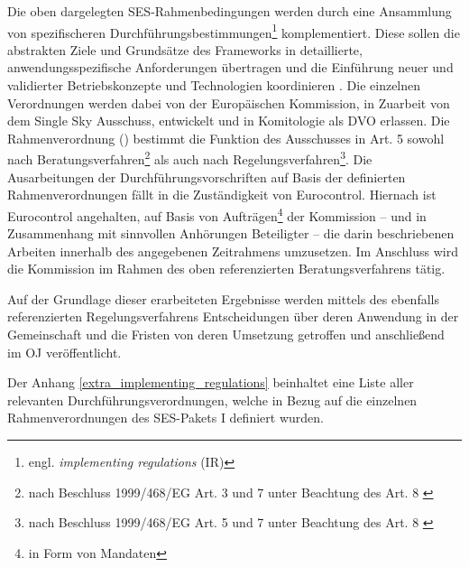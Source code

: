     Die oben dargelegten \ac{SES}-Rahmenbedingungen werden durch eine Ansammlung von spezifischeren Durchführungsbestimmungen\footnote{engl. \textit{implementing regulations} (IR)} komplementiert.
    Diese sollen die abstrakten Ziele und Grundsätze des Frameworks in detaillierte, anwendungsspezifische Anforderungen übertragen und die Einführung neuer und validierter Betriebskonzepte und Technologien koordinieren \cite[22]{baf_iop}.
    Die einzelnen  Verordnungen werden dabei von der Europäischen Kommission, in Zuarbeit von dem Single Sky Ausschuss, entwickelt und in Komitologie als \acf{DVO} erlassen.
    Die Rahmenverordnung () bestimmt die Funktion des Ausschusses in Art. 5 sowohl nach Beratungsverfahren\footnote{nach Beschluss 1999/468/EG Art. 3 und 7 unter Beachtung des Art. 8 \cite{31999D0468}} als auch nach Regelungsverfahren\footnote{nach Beschluss 1999/468/EG Art. 5 und 7 unter Beachtung des Art. 8 \cite{31999D0468}}.
    Die Ausarbeitungen der Durchführungsvorschriften auf Basis der definierten Rahmenverordnungen \cite[Art. 3]{2004R0549} fällt in die Zuständigkeit von Eurocontrol. 
    Hiernach ist Eurocontrol angehalten, auf Basis von Aufträgen\footnote{in Form von Mandaten} der Kommission -- und in Zusammenhang mit sinnvollen Anhörungen Beteiligter -- die darin beschriebenen Arbeiten innerhalb des angegebenen Zeitrahmens umzusetzen. 
    Im Anschluss wird die Kommission im Rahmen des oben referenzierten Beratungsverfahrens tätig.
    \cite[Art. 8. Abs. 1]{2004R0549}

    \medskip
    Auf der Grundlage dieser erarbeiteten Ergebnisse werden mittels des ebenfalls referenzierten Regelungsverfahrens Entscheidungen über deren Anwendung in der Gemeinschaft und die Fristen von deren Umsetzung getroffen und anschließend im \ac{OJ} veröffentlicht.
    \cite[Art. 8 Abs. 2]{2004R0549}
    
    \bigskip\noindent
    Der Anhang \ref{extra_implementing_regulations} beinhaltet eine Liste aller relevanten Durchführungsverordnungen, welche in Bezug auf die einzelnen Rahmenverordnungen des \ac{SES}-Pakets I definiert wurden.
